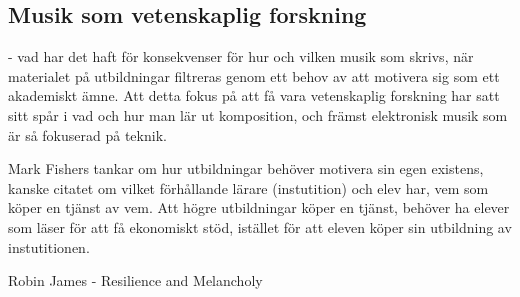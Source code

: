 \documentclass{article}
\begin{document}


\subsection{Musik som vetenskaplig forskning}
- vad har det haft för konsekvenser för hur och vilken musik som skrivs, när materialet på utbildningar filtreras
  genom ett behov av att motivera sig som ett akademiskt ämne. Att detta fokus på att få vara vetenskaplig
  forskning har satt sitt spår i vad och hur man lär ut komposition, och främst elektronisk musik som är så
  fokuserad på teknik. 

  Mark Fishers tankar om hur utbildningar behöver motivera sin egen existens, kanske citatet om vilket
  förhållande lärare (instutition) och elev har, vem som köper en tjänst av vem. Att högre utbildningar
  köper en tjänst, behöver ha elever som läser för att få ekonomiskt stöd, istället för att eleven köper sin
  utbildning av instutitionen. 

  Robin James - Resilience and Melancholy

	











\end{document}
